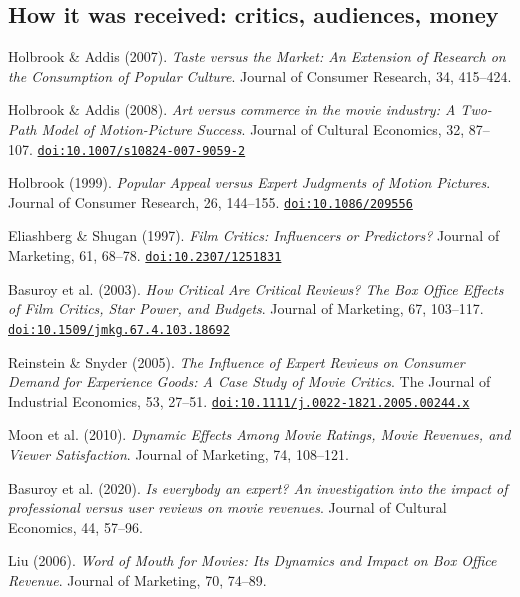 \subsection{How it was received: critics, audiences, money}
\begin{enumerate}[label={[\arabic*]},start=21,leftmargin=2.2em,itemsep=2pt]
\item Holbrook \& Addis (2007). \textit{Taste versus the Market: An Extension of Research on the Consumption of Popular Culture}. Journal of Consumer Research, 34, 415--424.  
\item Holbrook \& Addis (2008). \textit{Art versus commerce in the movie industry: A Two-Path Model of Motion-Picture Success}. Journal of Cultural Economics, 32, 87--107. \href{https://doi.org/10.1007/s10824-007-9059-2}{\nolinkurl{doi:10.1007/s10824-007-9059-2}} 
\item Holbrook (1999). \textit{Popular Appeal versus Expert Judgments of Motion Pictures}. Journal of Consumer Research, 26, 144--155. \href{https://doi.org/10.1086/209556}{\nolinkurl{doi:10.1086/209556}} 
\item Eliashberg \& Shugan (1997). \textit{Film Critics: Influencers or Predictors?} Journal of Marketing, 61, 68--78. \href{https://doi.org/10.2307/1251831}{\nolinkurl{doi:10.2307/1251831}} 
\item Basuroy et al. (2003). \textit{How Critical Are Critical Reviews? The Box Office Effects of Film Critics, Star Power, and Budgets}. Journal of Marketing, 67, 103--117. \href{https://doi.org/10.1509/jmkg.67.4.103.18692}{\nolinkurl{doi:10.1509/jmkg.67.4.103.18692}} 
\item Reinstein \& Snyder (2005). \textit{The Influence of Expert Reviews on Consumer Demand for Experience Goods: A Case Study of Movie Critics}. The Journal of Industrial Economics, 53, 27--51. \href{https://doi.org/10.1111/j.0022-1821.2005.00244.x}{\nolinkurl{doi:10.1111/j.0022-1821.2005.00244.x}} 
\item Moon et al. (2010). \textit{Dynamic Effects Among Movie Ratings, Movie Revenues, and Viewer Satisfaction}. Journal of Marketing, 74, 108--121.  
\item Basuroy et al. (2020). \textit{Is everybody an expert? An investigation into the impact of professional versus user reviews on movie revenues}. Journal of Cultural Economics, 44, 57--96.  
\item Liu (2006). \textit{Word of Mouth for Movies: Its Dynamics and Impact on Box Office Revenue}. Journal of Marketing, 70, 74--89.  

\end{enumerate}
